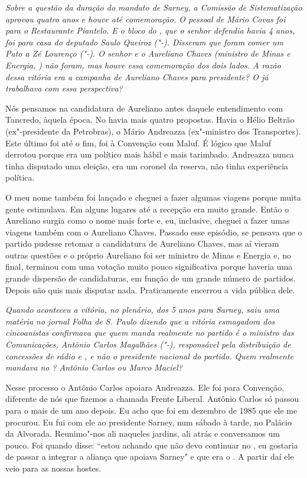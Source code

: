 \medskip

\emph{Sobre a questão da duração do mandato de Sarney, a Comissão de
Sistematização aprovou quatro anos e houve até comemoração. O pessoal de
Mário Covas foi para o Restaurante Piantelo. E o bloco do , que o
senhor defendia havia 4 anos, foi para casa do deputado Saulo Queiroz
("-). Disseram que foram comer um Pato a Zé Lourenço
("-). O senhor e o Aureliano Chaves (ministro de Minas e Energia,
) não foram, mas houve essa comemoração dos dois lados. A razão dessa
vitória era a campanha de Aureliano Chaves para presidente? O  já
trabalhava com essa perspectiva?}

Nós pensamos na candidatura de Aureliano antes daquele
entendimento com Tancredo, àquela época. No  havia mais quatro
propostas. Havia o Hélio Beltrão (ex"-presidente da Petrobras), o Mário
Andreazza (ex"-ministro dos Transportes). Este último foi até o fim, foi
à Convenção com Maluf. É lógico que Maluf derrotou porque era um
político mais hábil e mais tarimbado. Andreazza nunca tinha disputado
uma eleição, era um coronel da reserva, não tinha experiência política.

O meu nome também foi lançado e cheguei a fazer algumas viagens porque
muita gente estimulava. Em alguns lugares até a recepção era muito
grande. Então o Aureliano surgia como o nome mais forte e, eu,
inclusive, cheguei a fazer umas viagens também com o Aureliano Chaves.
Passado esse episódio, se pensava que o partido pudesse retomar a
candidatura de Aureliano Chaves, mas aí vieram outras questões e o
próprio Aureliano foi ser ministro de Minas e Energia e, no final,
terminou com uma votação muito pouco significativa porque haveria uma
grande dispersão de candidaturas, em função de um grande número de
partidos. Depois não quis mais disputar nada. Praticamente encerrou a
vida pública dele.

\medskip

\emph{Quando aconteceu a vitória, no plenário, dos 5 anos para Sarney,
saiu uma matéria no jornal Folha de S. Paulo dizendo que a vitória
esmagadora dos cincoanistas confirmava que quem manda realmente no
partido é o ministro das Comunicações, Antônio Carlos Magalhães
("-), responsável pela distribuição de concessões de rádio e , e
não o presidente nacional do partido. Quem realmente mandava no ?
Antônio Carlos ou Marco Maciel? }

Nesse processo o Antônio Carlos apoiara Andreazza. Ele
foi para Convenção, diferente de nós que fizemos a chamada Frente
Liberal. Antônio Carlos só passou para o  mais de um ano depois. Eu
acho que foi em dezembro de 1985 que ele me procurou. Eu fui com ele ao
presidente Sarney, num sábado à tarde, no Palácio da Alvorada.
Reunimo"-nos ali naqueles jardins, ali atrás e conversamos um pouco. Foi
quando  disse: ``estou achando que não devo continuar no , eu
gostaria de passar a integrar a aliança que apoiava Sarney" e que era o
. A partir daí ele veio para as nossas hostes.

